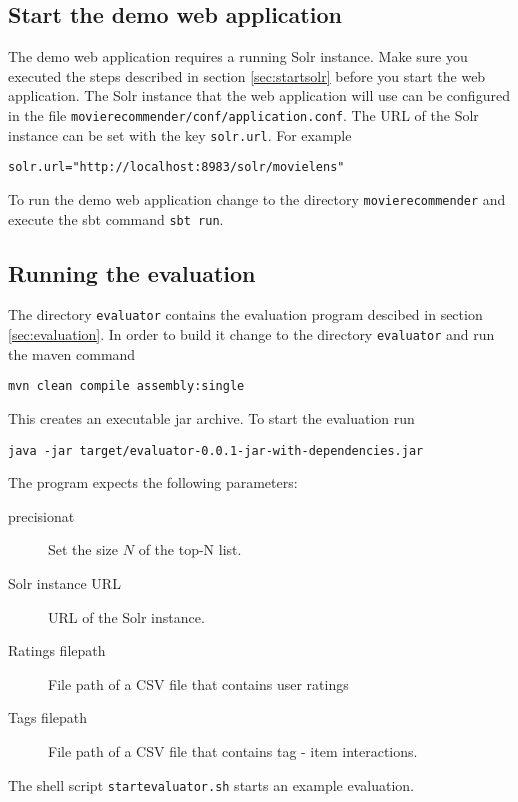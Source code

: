 \subsection{Start the demo web application}

The demo web application requires a running Solr instance. Make sure you executed the steps described in section \ref{sec:startsolr} before you start the web application. The Solr instance that the web application will use can be configured in the file \verb|movierecommender/conf/application.conf|. The URL of the Solr instance can be set with the key \verb|solr.url|. For example
\begin{verbatim}
solr.url="http://localhost:8983/solr/movielens"
\end{verbatim}

To run the demo web application change to the directory \verb|movierecommender| and execute the sbt command \verb|sbt run|.

\subsection{Running the evaluation}

The directory \verb|evaluator| contains the evaluation program descibed in section \ref{sec:evaluation}. In order to build it change to the directory \verb|evaluator| and run the maven command
\begin{verbatim}
mvn clean compile assembly:single
\end{verbatim}
This creates an executable jar archive. To start the evaluation run 
\begin{verbatim}
java -jar target/evaluator-0.0.1-jar-with-dependencies.jar
\end{verbatim}

The program expects the following parameters:
\begin{description}
\item[precisionat] Set the size $N$ of the top-N list.
\item[Solr instance URL] URL of the Solr instance.
\item[Ratings filepath] File path of a CSV file that contains user ratings
\item[Tags filepath] File path of a CSV file that contains tag - item interactions.
\end{description}

The shell script \verb|startevaluator.sh| starts an example evaluation.

